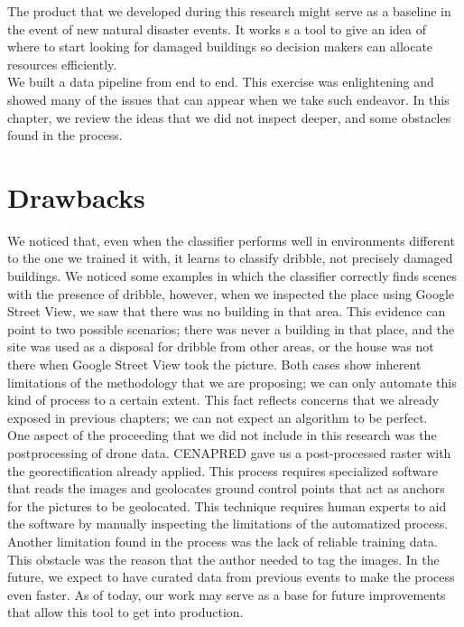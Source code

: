 The product that we developed during this research might serve as a baseline in the event of new natural disaster events. It works s a tool to give an idea of where to start looking for damaged buildings so decision makers can allocate resources efficiently.\\

We built a data pipeline from end to end. This exercise was enlightening and showed many of the issues that can appear when we take such endeavor. In this chapter, we review the ideas that we did not inspect deeper, and some obstacles found in the process.\\

\section{Drawbacks}

We noticed that, even when the classifier performs well in environments different to the one we trained it with, it learns to classify dribble, not precisely damaged buildings. We noticed some examples in which the classifier correctly finds scenes with the presence of dribble, however, when we inspected the place using Google Street View, we saw that there was no building in that area. This evidence can point to two possible scenarios; there was never a building in that place, and the site was used as a disposal for dribble from other areas, or the house was not there when Google Street View took the picture. Both cases show inherent limitations of the methodology that we are proposing; we can only automate this kind of process to a certain extent. This fact reflects concerns that we already exposed in previous chapters; we can not expect an algorithm to be perfect.\\

One aspect of the proceeding that we did not include in this research was the postprocessing of drone data. CENAPRED gave us a post-processed raster with the georectification already applied. This process requires specialized software that reads the images and geolocates ground control points that act as anchors for the pictures to be geolocated. This technique requires human experts to aid the software by manually inspecting the limitations of the automatized process.\\

Another limitation found in the process was the lack of reliable training data. This obstacle was the reason that the author needed to tag the images. In the future, we expect to have curated data from previous events to make the process even faster. As of today, our work may serve as a base for future improvements that allow this tool to get into production.\\

